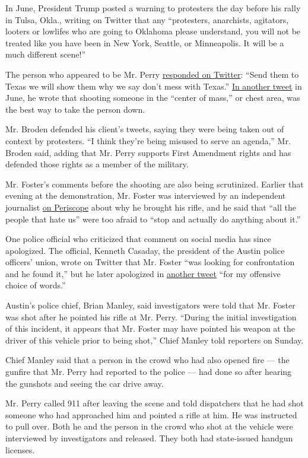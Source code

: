 In June, President Trump posted a warning to protesters the day before
his rally in Tulsa, Okla., writing on Twitter that any ``protesters,
anarchists, agitators, looters or lowlifes who are going to Oklahoma
please understand, you will not be treated like you have been in New
York, Seattle, or Minneapolis. It will be a much different scene!''

The person who appeared to be Mr. Perry
\href{http://archive.vn/MddfF}{responded on Twitter}: ``Send them to
Texas we will show them why we say don't mess with Texas.''
\href{http://archive.vn/ylS2i}{In another tweet} in June, he wrote that
shooting someone in the ``center of mass,'' or chest area, was the best
way to take the person down.

Mr. Broden defended his client's tweets, saying they were being taken
out of context by protesters. ``I think they're being misused to serve
an agenda,'' Mr. Broden said, adding that Mr. Perry supports First
Amendment rights and has defended those rights as a member of the
military.

Mr. Foster's comments before the shooting are also being scrutinized.
Earlier that evening at the demonstration, Mr. Foster was interviewed by
an independent journalist
\href{https://twitter.com/stillgray/status/1287278680817823747}{on
Periscope} about why he brought his rifle, and he said that ``all the
people that hate us'' were too afraid to ``stop and actually do anything
about it.''

One police official who criticized that comment on social media has
since apologized. The official, Kenneth Casaday, the president of the
Austin police officers' union, wrote on Twitter that Mr. Foster ``was
looking for confrontation and he found it,'' but he later apologized in
\href{https://twitter.com/KennethCasaday/status/1288506200720650244}{another
tweet} ``for my offensive choice of words.''

Austin's police chief, Brian Manley, said investigators were told that
Mr. Foster was shot after he pointed his rifle at Mr. Perry. ``During
the initial investigation of this incident, it appears that Mr. Foster
may have pointed his weapon at the driver of this vehicle prior to being
shot,'' Chief Manley told reporters on Sunday.

Chief Manley said that a person in the crowd who had also opened fire
--- the gunfire that Mr. Perry had reported to the police --- had done
so after hearing the gunshots and seeing the car drive away.

Mr. Perry called 911 after leaving the scene and told dispatchers that
he had shot someone who had approached him and pointed a rifle at him.
He was instructed to pull over. Both he and the person in the crowd who
shot at the vehicle were interviewed by investigators and released. They
both had state-issued handgun licenses.

